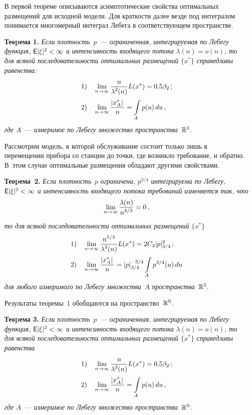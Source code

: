 \begin{multicols}{2}
В первой теореме описываются асимптотические свойства оптимальных размещений для исходной
модели. Для краткости далее везде под интегралом понимается многомерный интеграл Лебега в соответствующем пространстве.

\medskip
\noindent
\textbf{Теоpема 1.}  \textit{Если плотность~$p$~--- ограниченная, интегрируемая по Лебегу
функция, ${\sf E}|\xi|^2<\infty$  и интенсивность входящего потока $\lambda(n)=o(n)$,
то для всякой последовательности оптимальных размещений $\{x^*\}$ справедливы
равенства:}
\begin{align*}
1)\ \ \ & \liml{n\rightarrow \infty}\fr{n}{\lambda^2(n)}L(x^*)=0{,}5\beta_2\,;\\
2)\ \ \ &\liml{n\rightarrow\infty}\fr{\left|x_A^*\right|}{n}=\il{A}{}p(u)\,du\,,
\end{align*}
\textit{где $A$~--- измеримое по Лебегу множество пространства~${\mathbb{R}}^3$.}

\medskip

Рассмотрим модель, в которой обслуживание состоит только лишь в перемещении прибора со станции
до точки, где возникло требование, и обратно. В~этом случае оптимальные размещения обладают
другими свойствами.

\medskip

\noindent
\textbf{Теоpема~2.}  \textit{Если плотность~$p$ ограничена, $p^{3/4}$ интегрируема по Лебегу,
${{\sf E}}|\xi|^2<\infty$  и интенсивность входящего потока требований изменяется так, что}
$$
\lim\limits_{n\to\infty}\displaystyle\frac{\displaystyle \lambda(n)\mathstrut}{\displaystyle n^{4/3}\mathstrut}=0\,,
$$
\textit{то для всякой последовательности оптимальных размещений $\{x^*\}$}
\begin{align*}
1)\ \ \ &\limn\fr{n^{5/3}}{\lambda^2(n)}{L(x^*)}=2C_2|p|_{3/4}^2\,;\\
2)\ \ \ &\limn\fr{\left|x_A^*\right|}{n}=|p|_{3/4}^{-3/4}\il{A}{}p^{3/4}(u)\,du
\end{align*}
\textit{для любого измеримого по Лебегу множества~$A$ пространства~${\mathbb{R}}^3$}.

\medskip

Результаты теоремы~1 обобщаются на пространство~$\mathbb{R}^{\mathbb{N}}$.

\medskip

\noindent
\textbf{Теоpема 3.}  \textit{Если плотность~$p$~--- ограниченная, интегрируемая по Лебегу
функция, ${\sf E}|\xi|^2<\infty$ и интенсивность входящего потока $\lambda(n)=o(n)$,
то для всякой последовательности оптимальных размещений $\{x^*\}$ справедливы
равенства}
\begin{align*}
1)\ \ \ &\liml{n\rightarrow \infty}\fr{n}{\lambda^2(n)}L(x^*)=0{,}5\beta_2\,;\\
2)\ \ \ &\liml{n\rightarrow\infty}\fr{\left|x_A^*\right|}{n}=\il{A}{}p(u)\,du\,,
\end{align*}
\textit{где $A$~--- измеримое по Лебегу множество пространства~$\mathbb{R}^{\mathbb{N}}$}.


\end{multicols}

